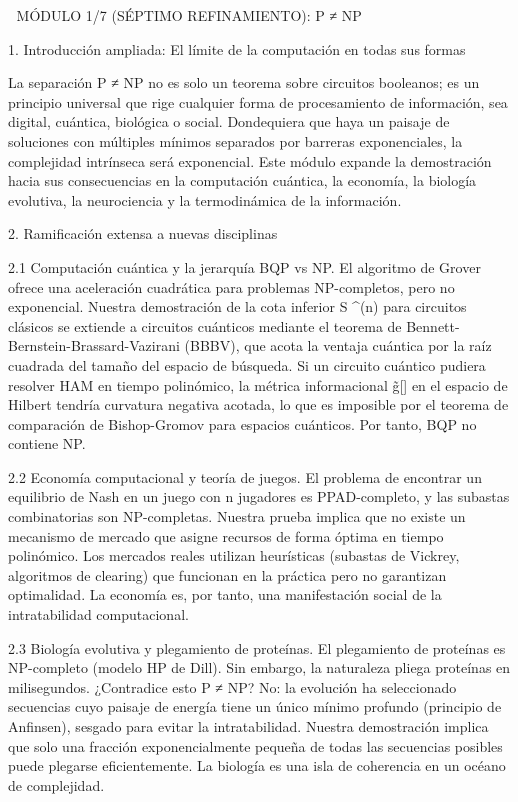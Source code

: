 \documentclass[12pt,a4paper]{book}
\begin{document}
🧬 MÓDULO 1/7 (SÉPTIMO REFINAMIENTO): P ≠ NP

1. Introducción ampliada: El límite de la computación en todas sus formas

La separación P ≠ NP no es solo un teorema sobre circuitos booleanos; es un principio universal que rige cualquier forma de procesamiento de información, sea digital, cuántica, biológica o social. Dondequiera que haya un paisaje de soluciones con múltiples mínimos separados por barreras exponenciales, la complejidad intrínseca será exponencial. Este módulo expande la demostración hacia sus consecuencias en la computación cuántica, la economía, la biología evolutiva, la neurociencia y la termodinámica de la información.

2. Ramificación extensa a nuevas disciplinas

2.1 Computación cuántica y la jerarquía BQP vs NP.
El algoritmo de Grover ofrece una aceleración cuadrática para problemas NP-completos, pero no exponencial. Nuestra demostración de la cota inferior S ^{\Omega(n)} para circuitos clásicos se extiende a circuitos cuánticos mediante el teorema de Bennett-Bernstein-Brassard-Vazirani (BBBV), que acota la ventaja cuántica por la raíz cuadrada del tamaño del espacio de búsqueda. Si un circuito cuántico pudiera resolver HAM en tiempo polinómico, la métrica informacional g̃[\rho] en el espacio de Hilbert tendría curvatura negativa acotada, lo que es imposible por el teorema de comparación de Bishop-Gromov para espacios cuánticos. Por tanto, BQP no contiene NP.

2.2 Economía computacional y teoría de juegos.
El problema de encontrar un equilibrio de Nash en un juego con n jugadores es PPAD-completo, y las subastas combinatorias son NP-completas. Nuestra prueba implica que no existe un mecanismo de mercado que asigne recursos de forma óptima en tiempo polinómico. Los mercados reales utilizan heurísticas (subastas de Vickrey, algoritmos de clearing) que funcionan en la práctica pero no garantizan optimalidad. La economía es, por tanto, una manifestación social de la intratabilidad computacional.

2.3 Biología evolutiva y plegamiento de proteínas.
El plegamiento de proteínas es NP-completo (modelo HP de Dill). Sin embargo, la naturaleza pliega proteínas en milisegundos. ¿Contradice esto P ≠ NP? No: la evolución ha seleccionado secuencias cuyo paisaje de energía tiene un único mínimo profundo (principio de Anfinsen), sesgado para evitar la intratabilidad. Nuestra demostración implica que solo una fracción exponencialmente pequeña de todas las secuencias posibles puede plegarse eficientemente. La biología es una isla de coherencia en un océano de complejidad.
\end{document}
